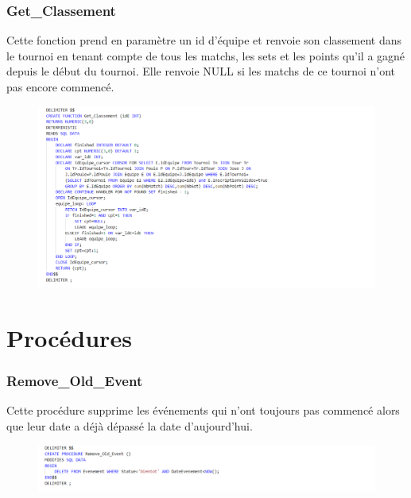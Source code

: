 \documentclass[a4paper,12pt]{report}   %
\begin{document}
\subsubsection*{Get\_Classement}
Cette fonction prend en paramètre un id d'équipe et renvoie son classement dans le tournoi en tenant compte de tous les matchs, les sets et les points qu'il a gagné depuis le début du tournoi. Elle renvoie NULL si les matchs de ce tournoi n'ont pas encore commencé. 
\begin{center}
	\begin{figure}[!h]
          \includegraphics[width=24cm]{fonction}  
    \end{figure}
\end{center}

\newpage

\section*{Procédures}
\subsubsection*{Remove\_Old\_Event}
Cette procédure supprime les événements qui n'ont toujours pas commencé alors que leur date a déjà dépassé la date d'aujourd'hui.
\begin{center}
	\begin{figure}[!h]
          \includegraphics[width=24cm]{procedure}  
    \end{figure}
\end{center}
\end{document}
